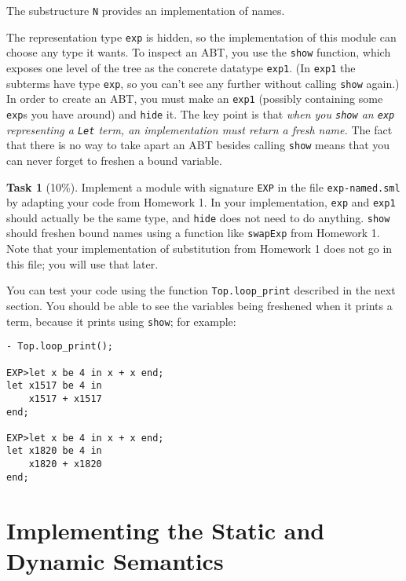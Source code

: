 \documentclass[11pt]{article}
\newcommand{\task}[2]
  {\bigskip \noindent
   {\bf Task #1} (#2\%).}
\newcommand{\ttt}[1]{\texttt{#1}}
\begin{document}
The substructure \ttt{N} provides an implementation of names. 

The representation type \ttt{exp} is hidden, so the implementation of
this module can choose any type it wants.  To inspect an ABT, you use
the \ttt{show} function, which exposes one level of the tree as the
concrete datatype \ttt{exp1}. (In \ttt{exp1} the subterms have type
\ttt{exp}, so you can't see any further without calling \ttt{show}
again.) In order to create an ABT, you must make an \ttt{exp1} (possibly
containing some \ttt{exp}s you have around) and \ttt{hide} it.  The key
point is that \emph{when you \ttt{show} an \ttt{exp} representing a
  \ttt{Let} term, an implementation must return a fresh name.}  The fact
that there is no way to take apart an ABT besides calling \verb|show|
means that you can never forget to freshen a bound variable.  

\task{1}{10} Implement a module with signature \verb|EXP| in the file
\verb|exp-named.sml| by adapting your code from Homework 1.  In your
implementation, \verb|exp| and \verb|exp1| should actually be the same
type, and \verb|hide| does not need to do anything.  \verb|show| should
freshen bound names using a function like \verb|swapExp| from Homework 1.
Note that your implementation of substitution from Homework 1 does not
go in this file; you will use that later.  

You can test your code using the function \verb|Top.loop_print|
described in the next section.  You should be able to see the variables
being freshened when it prints a term, because it prints using
\verb|show|; for example:

\begin{verbatim}
- Top.loop_print();

EXP>let x be 4 in x + x end;
let x1517 be 4 in
    x1517 + x1517
end;

EXP>let x be 4 in x + x end;
let x1820 be 4 in
    x1820 + x1820
end;
\end{verbatim}

\section{Implementing the Static and Dynamic Semantics}
\end{document}
